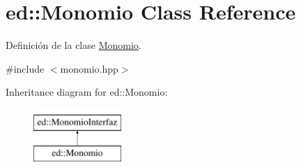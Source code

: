 \hypertarget{classed_1_1Monomio}{\section{ed\-:\-:Monomio Class Reference}
\label{classed_1_1Monomio}
}


Definición de la clase \hyperlink{classed_1_1Monomio}{Monomio}.  




{\ttfamily \#include $<$monomio.\-hpp$>$}

Inheritance diagram for ed\-:\-:Monomio\-:\begin{figure}[H]
\begin{center}
\leavevmode
\includegraphics[height=2.000000cm]{classed_1_1Monomio}
\end{center}
\end{figure}
